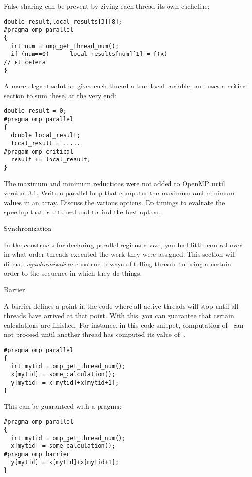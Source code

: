 False sharing can be prevent by giving each thread its own cacheline:
\begin{verbatim}
double result,local_results[3][8];
#pragma omp parallel
{
  int num = omp_get_thread_num();
  if (num==0)      local_results[num][1] = f(x)
// et cetera
}
\end{verbatim}
A more elegant solution gives each thread a true local variable,
and uses a critical section to sum these, at the very end:
\begin{verbatim}
double result = 0;
#pragma omp parallel
{
  double local_result;
  local_result = .....
#pragam omp critical
  result += local_result;
}
\end{verbatim}

\begin{exercise}
  The maximum and minimum reductions were not added to OpenMP until
  version~3.1. Write a parallel loop that computes the maximum and
  minimum values in an array. Discuss the various options. Do timings
  to evaluate the speedup that is attained and to find the best option.
\end{exercise}

 {Synchronization}

In the constructs for declaring parallel regions above, you had little control over 
in what order threads executed the work they were assigned.
This section will discuss \emph{synchronization} constructs: ways of telling
threads to bring a certain order to the sequence in which they do things.

 {Barrier}

A barrier defines a point in the code where all active threads will stop
until all threads have arrived at that point. With this, you can guarantee that
certain calculations are finished. For instance, in this code snippet, computation 
of~ can not proceed until another thread has computed its value of~.
\begin{verbatim}
#pragma omp parallel 
{
  int mytid = omp_get_thread_num();
  x[mytid] = some_calculation();
  y[mytid] = x[mytid]+x[mytid+1];
}
\end{verbatim}
This can be guaranteed with a  pragma:
\begin{verbatim}
#pragma omp parallel 
{
  int mytid = omp_get_thread_num();
  x[mytid] = some_calculation();
#pragma omp barrier
  y[mytid] = x[mytid]+x[mytid+1];
}
\end{verbatim}

